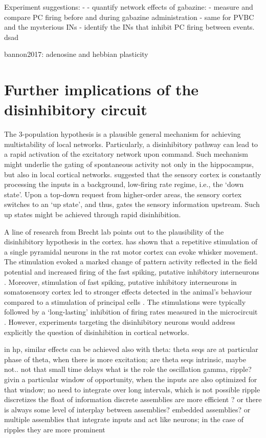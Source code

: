   Experiment suggestions: -
  - quantify network effects of gabazine:
  - measure and compare PC firing before and during gabazine administration
  - same for PVBC and the mysterious INs
  - identify the INs that inhibit PC firing between events.
  dsad 

  bannon2017: adenosine and hebbian plasticity


\section{Further implications of the disinhibitory circuit}
  The 3-population hypothesis is a plausible general mechanism for achieving
  multistability of local networks. Particularly, a disinhibitory pathway can
  lead to a rapid activation of the excitatory network upon command.  Such
  mechanism might underlie the gating of spontaneous activity not only in the
  hippocampus, but also in local cortical networks. \cite{Luczak2013} suggested
  that the sensory cortex is constantly processing the inputs in a background,
  low-firing rate regime, i.e., the `down state'. Upon a top-down request from
  higher-order areas, the sensory cortex switches to an `up state', and thus,
  gates the sensory information upstream. Such up states might be achieved
  through rapid disinhibition.

  A line of research from Brecht lab points out to the plausibility of the
  disinhibitory hypothesis in the cortex. \cite{Brecht2004} has shown that a
  repetitive stimulation of a single pyramidal neurons in the rat motor cortex
  can evoke whisker movement. The stimulation evoked a marked change of pattern
  activity reflected in the field potential and increased firing of the fast
  spiking, putative inhibitory interneurons \citep{Houweling2007, Doron2014}.
  Moreover, stimulation of fast spiking, putative inhibitory interneurons in
  somatosensory cortex led to stronger effects detected in the animal's
  behaviour compared to a stimulation of principal cells \citep{Doron2014}.
  The stimulations were typically followed by a `long-lasting' inhibition of
  firing rates measured in the microcircuit \citep{Doron2014}. However,
  experiments targeting the disinhibitory neurons would address explicitly the
  question of disinhibition in cortical networks.
  
  in hp, similar effects can be achieved also with theta: theta seqs are at particular phase of
  theta, when there is more excitation; are theta seqs intrinsic, maybe not.. not that small time delays
  what is the role the oscillation gamma, ripple?
  givin a particular window of opportunity, when the inputs are also optimized for that window; no need
  to integrate over long intervals, which is not possible
  ripple discretizes the float of information
  discrete assemblies are more efficient ? or there is always some level of interplay between assemblies?
  embedded assemblies? or multiple assemblies that integrate inputs and act like neurons; in the case of ripples they are more prominent

